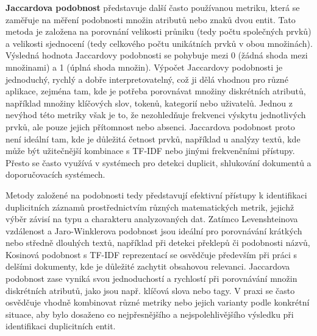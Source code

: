 \textbf{Jaccardova podobnost} představuje další často používanou metriku, která se zaměřuje na měření podobnosti množin atributů nebo znaků dvou entit. Tato metoda je založena na porovnání velikosti průniku (tedy počtu společných prvků) a velikosti sjednocení (tedy celkového počtu unikátních prvků v obou množinách). Výsledná hodnota Jaccardovy podobnosti se pohybuje mezi 0 (žádná shoda mezi množinami) a 1 (úplná shoda množin). Výpočet Jaccardovy podobnosti je jednoduchý, rychlý a dobře interpretovatelný, což ji dělá vhodnou pro různé aplikace, zejména tam, kde je potřeba porovnávat množiny diskrétních atributů, například množiny klíčových slov, tokenů, kategorií nebo uživatelů. Jednou z nevýhod této metriky však je to, že nezohledňuje frekvenci výskytu jednotlivých prvků, ale pouze jejich přítomnost nebo absenci. Jaccardova podobnost proto není ideální tam, kde je důležitá četnost prvků, například u analýzy textů, kde může být užitečnější kombinace s TF-IDF nebo jinými frekvenčními přístupy. Přesto se často využívá v systémech pro detekci duplicit, shlukování dokumentů a doporučovacích systémech.

Metody založené na podobnosti tedy představují efektivní přístupy k identifikaci duplicitních záznamů prostřednictvím různých matematických metrik, jejichž výběr závisí na typu a charakteru analyzovaných dat. Zatímco Levenshteinova vzdálenost a Jaro-Winklerova podobnost jsou ideální pro porovnávání krátkých nebo středně dlouhých textů, například při detekci překlepů či podobnosti názvů, Kosinová podobnost s TF-IDF reprezentací se osvědčuje především při práci s delšími dokumenty, kde je důležité zachytit obsahovou relevanci. Jaccardova podobnost zase vyniká svou jednoduchostí a rychlostí při porovnávání množin diskrétních atributů, jako jsou např. klíčová slova nebo tagy. V praxi se často osvědčuje vhodně kombinovat různé metriky nebo jejich varianty podle konkrétní situace, aby bylo dosaženo co nejpřesnějšího a nejspolehlivějšího výsledku při identifikaci duplicitních entit.



